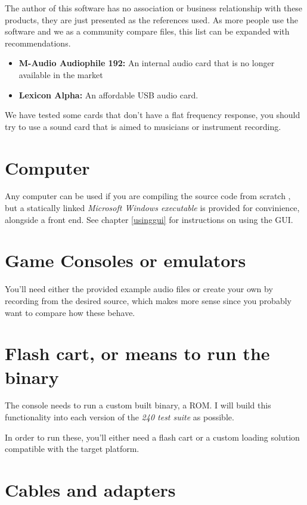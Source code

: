 \documentclass[10pt,a4paper]{report}
\begin{document}
The author of this software has no association or business relationship with these products, they are just presented as the references used. As more people use the software and we as a community compare files, this list can be expanded with recommendations.

\begin{itemize}
	\item \textbf{M-Audio Audiophile 192:} An internal audio card that is no longer available in the market \cite{maudio}
	\item \textbf{Lexicon Alpha:} An affordable USB audio card. \cite{lexicon}
\end{itemize}

We have tested some cards that don't have a flat frequency response, you should try to use a sound card that is aimed to musicians or instrument recording.

\section{Computer}

Any computer can be used if you are compiling the source code from scratch \cite{sourcecode}, but a statically linked \textit{Microsoft Windows executable} is provided for convinience, alongside a front end. See chapter \ref{usinggui} for instructions on using the GUI.

\section{Game Consoles or emulators}

You'll need either the provided example audio files or create your own by recording from the desired source, which makes more sense since you probably want to compare how these behave.

\section{Flash cart, or means to run the binary}

The console needs to run a custom built binary, a ROM. I will build this functionality into each version of the \textit{240 test suite}\cite{240pSuite} as possible.

In order to run these, you'll either need a flash cart or a custom loading solution compatible with the target platform.

\section{Cables and adapters}
\end{document}
